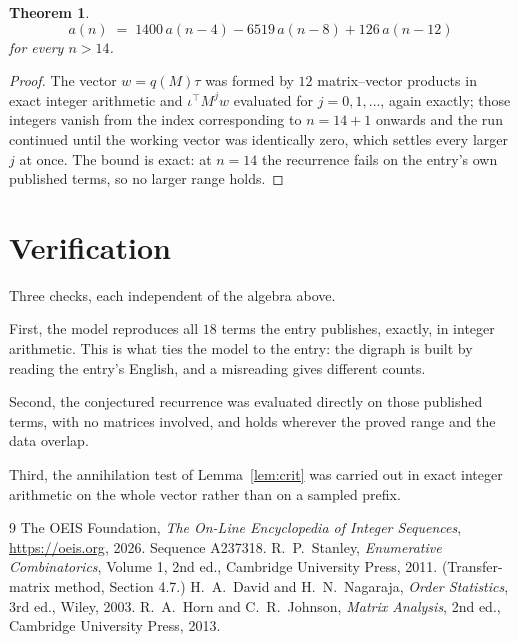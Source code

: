 \documentclass[11pt,a4paper]{article}
\theoremstyle{plain}
\newtheorem{theorem}{Theorem}
\theoremstyle{definition}
\begin{document}
\begin{theorem}
\[
a(n)\;=\;1400\,a(n-4) - 6519\,a(n-8) + 126\,a(n-12)
\]
for every $n>14$.
\end{theorem}

\begin{proof}
The vector $w=q(M)\tau$ was formed by $12$ matrix--vector products in exact integer
arithmetic and $\iota^{\!\top}M^{j}w$ evaluated for $j=0,1,\dots$, again exactly; those
integers vanish from the index corresponding to $n=14+1$ onwards and the run continued
until the working vector was identically zero, which settles every larger $j$ at once. The bound is exact: at $n=14$ the recurrence fails on the entry's own published terms, so no larger range holds.
\end{proof}

\section{Verification}

Three checks, each independent of the algebra above.

First, the model reproduces all $18$ terms the entry publishes, exactly, in integer
arithmetic. This is what ties the model to the entry: the digraph is built by reading the
entry's English, and a misreading gives different counts.

Second, the conjectured recurrence was evaluated directly on those published terms, with no
matrices involved, and holds wherever the proved range and the data overlap.

Third, the annihilation test of Lemma~\ref{lem:crit} was carried out in exact integer
arithmetic on the whole vector rather than on a sampled prefix.

\begin{thebibliography}{9}
 The OEIS Foundation, \emph{The On-Line Encyclopedia of Integer
Sequences}, \url{https://oeis.org}, 2026. Sequence A237318.
 R.~P.~Stanley, \emph{Enumerative Combinatorics}, Volume 1, 2nd ed.,
Cambridge University Press, 2011. (Transfer-matrix method, Section 4.7.)
 H.~A.~David and H.~N.~Nagaraja, \emph{Order Statistics}, 3rd ed., Wiley,
2003.
 R.~A.~Horn and C.~R.~Johnson, \emph{Matrix Analysis}, 2nd ed., Cambridge
University Press, 2013.
\end{thebibliography}
\end{document}
